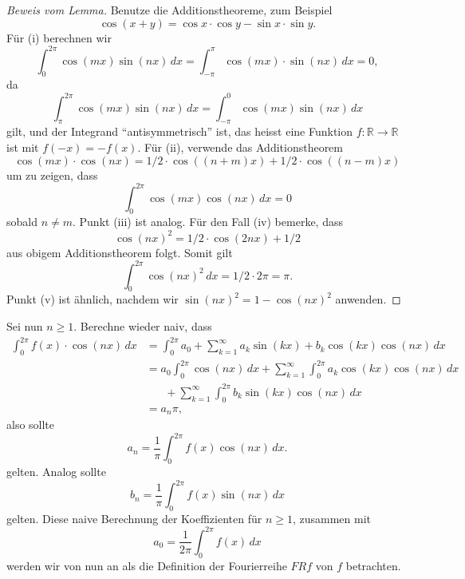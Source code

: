 \documentclass[../main.tex]{subfiles}
\begin{document}
\begin{proof}[Beweis vom Lemma]
  Benutze die Additionstheoreme, zum Beispiel
  \[
    \cos(x + y) = \cos x \cdot \cos y - \sin x \cdot \sin y.
  \]
  Für (i) berechnen wir
  \[
    \int_{0}^{2\pi} \cos(mx) \sin(nx) \, dx
     = \int_{-\pi}^{\pi} \cos(mx) \cdot \sin(nx) \, dx = 0,
\]
  da
  \[
    \int_{\pi}^{2\pi} \cos(mx) \sin(nx) \, dx
    = \int_{-\pi}^{0} \cos(mx) \sin(nx) \, dx
  \]
  gilt, und der Integrand ``antisymmetrisch'' ist, das heisst eine
  Funktion $f \colon \mathbb{R} \to \mathbb{R}$ ist mit
  $f(-x) = -f(x)$.
  Für (ii), verwende das Additionstheorem 
  \[
    \cos(mx) \cdot \cos(nx) = 1/2 \cdot \cos((n+m)x) + 1/2 \cdot \cos ((n-m)x)
  \]
  um zu zeigen, dass
  \[
    \int_{0}^{2\pi} \cos(mx) \cos(nx) \, dx = 0
  \]
  sobald $n \neq m$. Punkt (iii) ist analog.
  Für den Fall (iv) bemerke, dass
  \[
    {\cos(nx)}^2 = 1/2 \cdot \cos(2nx) + 1/2
  \]
  aus obigem Additionstheorem folgt. Somit gilt
  \[
    \int_{0}^{2\pi} {\cos(nx)}^2 \, dx = 1/2 \cdot 2 \pi = \pi.
  \]
  Punkt (v) ist ähnlich, nachdem wir ${\sin(nx)}^2 = 1 - {\cos(nx)}^2$ anwenden.
\end{proof}

Sei nun $n \geq 1$.
Berechne wieder naiv, dass
\begin{align*}
  \int_{0}^{2\pi} f(x) \cdot \cos(nx) \, dx
  &= \int_{0}^{2\pi} a_0 + \sum_{k=1}^{\infty} a_k \sin(kx) + b_k \cos(kx) \cos(nx) \, dx  \\
  &= a_0 \int_{0}^{2\pi} \cos(nx) \, dx
  + \sum_{k=1}^{\infty} \int_{0}^{2\pi} a_k \cos(kx)\cos(nx) \, dx\\
  &\;\;\;\;\;\;  + \sum_{k=1}^{\infty} \int_{0}^{2\pi} b_k \sin(kx) \cos(nx) \, dx\\
  &= a_n \pi,
\end{align*}
also sollte
\[
  a_n = \frac{1}{\pi} \int_{0}^{2\pi} f(x) \cos(nx) \, dx.
\]
gelten.
Analog sollte
\[
  b_n = \frac{1}{\pi}\int_{0}^{2\pi} f(x) \sin(nx) \, dx
\]
gelten. Diese naive Berechnung der Koeffizienten für $n \geq 1$, zusammen mit
\[
  a_0 = \frac{1}{2\pi} \int_{0}^{2\pi} f(x) \, dx
\]
werden wir von nun
an als die Definition der Fourierreihe $FRf$ von $f$ betrachten.
\end{document}
